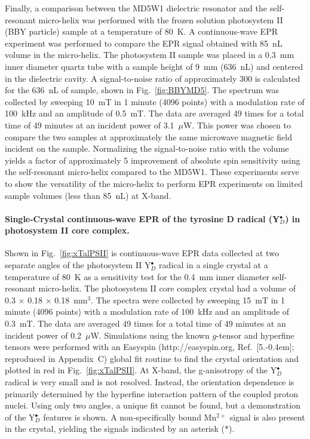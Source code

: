 Finally, a comparison between the MD5W1 dielectric resonator and the self-resonant micro-helix was performed with the frozen solution photosystem II (BBY particle) sample at a temperature of 80~K. A continuous-wave EPR experiment was performed to compare the EPR signal obtained with 85~nL volume in the micro-helix. The photosystem II sample was placed in a 0.3~mm inner diameter quartz tube with a sample height of 9~mm (636~nL) and centered in the dielectric cavity. A signal-to-noise ratio of approximately 300 is calculated for the 636~nL of sample, shown in Fig.~\ref{fig:BBYMD5}. The spectrum was collected by sweeping 10~mT in 1 minute (4096 points) with a modulation rate of 100~kHz and an amplitude of 0.5~mT. The data are averaged 49 times for a total time of 49 minutes at an incident power of 3.1~$\mu$W. This power was chosen to compare the two samples at approximately the same microwave magnetic field incident on the sample. Normalizing the signal-to-noise ratio with the volume yields a factor of approximately 5 improvement of absolute spin sensitivity using the self-resonant micro-helix compared to the MD5W1. These experiments serve to show the versatility of the micro-helix to perform EPR experiments on limited sample volumes (less than 85~nL) at X-band.

\paragraph{Single-Crystal continuous-wave EPR of the tyrosine D radical (Y$_D^\bullet$) in photosystem II core complex.}
Shown in Fig.~\ref{fig:xTalPSII} is continuous-wave EPR data collected at two separate angles of the photosystem II Y$_D^\bullet$ radical in a single crystal at a temperature of 80~K as a sensitivity test for the 0.4~mm inner diameter self-resonant micro-helix. The photosystem II core complex crystal had a volume of 0.3 $\times$ 0.18 $\times$ 0.18~mm$^3$. The spectra were collected by sweeping 15~mT in 1 minute (4096 points) with a modulation rate of 100~kHz and an amplitude of 0.3~mT. The data are averaged 49 times for a total time of 49 minutes at an incident power of 0.2~$\mu$W. Simulations using the known $g$-tensor and hyperfine tensors \cite{Hofbauer6623} were performed with an Easyspin (http://easyspin.org, Ref.~[5.\kern-0.4em]; reproduced in Appendix~C) global fit routine to find the crystal orientation and plotted in red in Fig.~\ref{fig:xTalPSII}. At X-band, the g-anisotropy of the Y$_D^\bullet$ radical is very small and is not resolved. Instead, the orientation dependence is primarily determined by the hyperfine interaction pattern of the coupled proton nuclei. \cite{Hofbauer6623} Using only two angles, a unique fit cannot be found, but a demonstration of the Y$_D^\bullet$ features is shown. A non-specifically bound Mn$^{2+}$ signal is also present in the crystal, yielding the signals indicated by an asterisk (\mbox{\large $\ast$}). 

